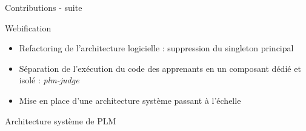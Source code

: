 \begin{frame}{Contributions - suite}
    \begin{block}{Webification}
        \begin{itemize}
            \item Refactoring de l'architecture logicielle : suppression du singleton principal
            \item Séparation de l'exécution du code des apprenants en un composant dédié et isolé : \emph{plm-judge}
            \item Mise en place d'une architecture système passant à l'échelle
        \end{itemize}
    \end{block}
\end{frame}

\begin{frame}{Architecture système de PLM}
    \begin{figure}
    \end{figure}
\end{frame}
